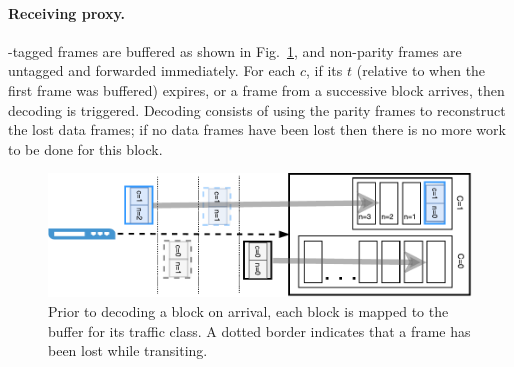 \paragraph{Receiving proxy.}
\OurSys-tagged frames are buffered as shown in Fig.~\ref{fig:example-decode},
and non-parity frames are untagged and forwarded immediately.
For each $c$, if its $t$ (relative to when the first
frame was buffered) expires, or a frame from a successive block arrives, 
then decoding is triggered. Decoding consists of using the parity frames to
reconstruct the lost data frames; if no data frames have been lost then there
is no more work to be done for this block.

\begin{figure}
  \centering
  \includegraphics[width=0.4\paperwidth]{figures/example-decode.pdf}
  \caption{\label{fig:example-decode}Prior to decoding a block on arrival, each block is mapped to the buffer for its traffic class. A dotted border indicates that a frame has been lost while transiting.}
\end{figure}

